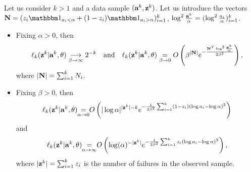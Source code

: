 \begin{prop}\label{prop:likelihood}
    Let us consider $k>1$ and a data sample $(\mathbf{a}^k, \mathbf{z}^k)$. 
    Let us introduce the vectors $\mbf N=(z_i\indic_{a_i<\alpha}+(1-z_i)\indic_{a_i>\alpha})_{i=1}^k$, $\log^2\frac{\mathbf{a}^k}{\alpha}=(\log^2\frac{a_i}{\alpha})_{i=1}^k$.  
    
    \begin{itemize}
        \item Fixing $\alpha>0$, then 
        \begin{equation}
        \ell_k(\mathbf{z}^k|\mathbf{a}^k,\theta) \overset{\ }{\underset{\beta\rightarrow\infty}{\longrightarrow}}2^{-k}\quad\text{and}\quad
            \ell_k(\mathbf{z}^k|\mathbf{a}^k,\theta) \overset{}{\underset{\beta\rightarrow0}{=}}O\left(\beta^{|\mathbf{N}|}e^{-\frac{\mathbf{N}^T\log^2\frac{\mathbf{a}^k}{\alpha}}{2\beta^2}}\right) ,
        \end{equation}
        where $|\mathbf{N}|=\sum_{i=1}^kN_i$.
        \item Fixing $\beta>0$, then
        \begin{equation}
            \ell_k(\mathbf{z}^k|\mathbf{a}^k,\theta) \hspace*{-3pt} \overset{}{\underset{\alpha\rightarrow0}{=}}\hspace*{-3pt} O\left(|\log\alpha|^{|\mathbf{z}^k|-k} e^{-\frac{1}{2\beta^2}\sum_{i=1}^k (1-z_i)(\log a_i-\log\alpha)^2} \right)
        \end{equation}
        and 
        \begin{equation}
            \ell_k(\mathbf{z}^k|\mathbf{a}^k,\theta) \hspace*{-3pt}\overset{}{\underset{\alpha\rightarrow\infty}{=}}\hspace*{-3pt} O\left(\log(\alpha)^{-|\mathbf{z}^k|} e^{-\frac{1}{2\beta^2}\sum_{i=1}^k z_i(\log a_i-\log\alpha)^2} \right) ,
        \end{equation}
        where $|\mathbf{z}^k|=\sum_{i=1}^kz_i$ is the number of failures in the observed sample.
    \end{itemize}
\end{prop}



